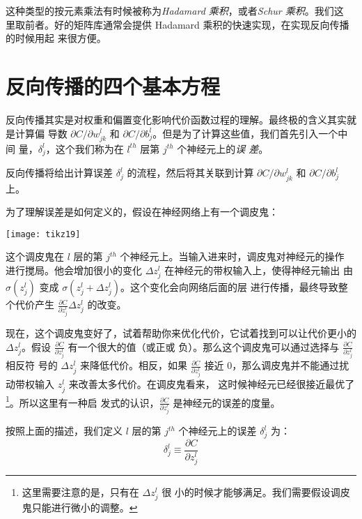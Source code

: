 这种类型的按元素乘法有时候被称为\emph{Hadamard 乘积}，或者\emph{Schur 乘积}。我们这
里取前者。好的矩阵库通常会提供 Hadamard 乘积的快速实现，在实现反向传播的时候用起
来很方便。

\section{反向传播的四个基本方程}
\label{sec:the_four_fundamental_equations_behind_backpropagation}

反向传播其实是对权重和偏置变化影响代价函数过程的理解。最终极的含义其实就是计算偏
导数 $\partial C/\partial w_{jk}^l$ 和
$\partial C/\partial b_j^l$。但是为了计算这些值，我们首先引入一个中间
量，$\delta_j^l$，这个我们称为在 $l^{th}$ 层第 $j^{th}$ 个神经元上的\emph{误
  差}。

反向传播将给出计算误差 $\delta_j^l$ 的流程，然后将其关联到计算 $\partial
C/\partial w_{jk}^l$ 和 $\partial C/\partial b_j^l$ 上。

为了理解误差是如何定义的，假设在神经网络上有一个调皮鬼：

\begin{center}
  \texttt{[image: tikz19]}
\end{center}

这个调皮鬼在 $l$ 层的第 $j^{th}$ 个神经元上。当输入进来时，调皮鬼对神经元的操作
进行搅局。他会增加很小的变化 $\Delta z_j^l$ 在神经元的带权输入上，使得神经元输出
由 $\sigma(z_j^l)$ 变成 $\sigma(z_j^l + \Delta z_j^l)$。这个变化会向网络后面的层
进行传播，最终导致整个代价产生 $\frac{\partial C}{\partial z_j^l} \Delta z_j^l$
的改变。

现在，这个调皮鬼变好了，试着帮助你来优化代价，它试着找到可以让代价更小的
$\Delta z_j^l$。假设 $\frac{\partial C}{\partial z_j^l}$ 有一个很大的值（或正或
  负）。那么这个调皮鬼可以通过选择与 $\frac{\partial C}{\partial z_j^l}$ 相反符
号的 $\Delta z_j^l$ 来降低代价。相反，如果 $\frac{\partial C}{\partial z_j^l}$
接近 $0$，那么调皮鬼并不能通过扰动带权输入 $z_j^l$ 来改善太多代价。在调皮鬼看来，
这时候神经元已经很接近最优了\footnote{这里需要注意的是，只有在 $\Delta z_j^l$ 很
  小的时候才能够满足。我们需要假设调皮鬼只能进行微小的调整。}。所以这里有一种启
发式的认识，$\frac{\partial C}{\partial z_j^l}$ 是神经元的误差的度量。

按照上面的描述，我们定义 $l$ 层的第 $j^{th}$ 个神经元上的误差 $\delta_j^l$ 为：
\begin{equation}
  \delta^l_j \equiv \frac{\partial C}{\partial z^l_j}
  \label{eq:29}\tag{29}
\end{equation}

